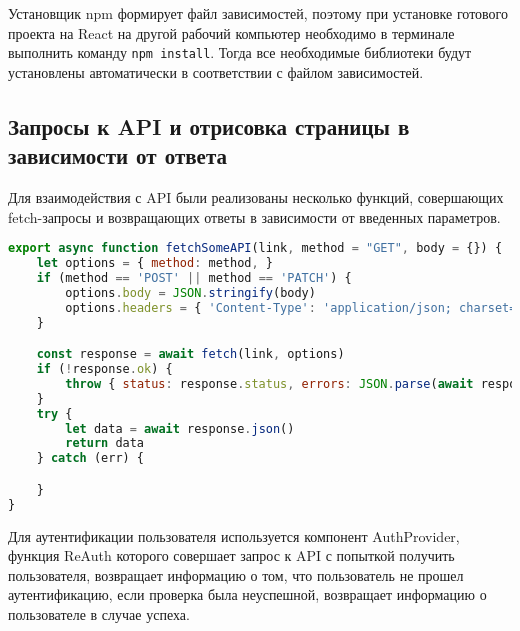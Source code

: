 \documentclass[a4paper,12pt]{article}
\begin{document}
Установщик npm формирует файл зависимостей, поэтому при установке готового проекта на React на другой рабочий компьютер необходимо в терминале выполнить команду \texttt{npm install}. Тогда все необходимые библиотеки будут установлены автоматически в соответствии с файлом зависимостей.

\subsection{Запросы к API и отрисовка страницы в зависимости от ответа}
Для взаимодействия с API были реализованы несколько функций, совершающих fetch-запросы и возвращающих ответы в зависимости от введенных параметров.


\begin{lstlisting}[language=JavaScript, caption={Вспомогательная функция, использующаяся для осуществления fetch-запросов с параметрами.}]
export async function fetchSomeAPI(link, method = "GET", body = {}) {
    let options = { method: method, }
    if (method == 'POST' || method == 'PATCH') {
        options.body = JSON.stringify(body)
        options.headers = { 'Content-Type': 'application/json; charset=UTF-8', }
    }

    const response = await fetch(link, options)
    if (!response.ok) {
        throw { status: response.status, errors: JSON.parse(await response.text() || "{}")?.errors }
    }
    try {
        let data = await response.json()
        return data
    } catch (err) {

    }
}
\end{lstlisting}

Для аутентификации пользователя используется компонент AuthProvider, функция ReAuth которого совершает запрос к API с попыткой получить пользователя, возвращает информацию о том, что пользователь не прошел аутентификацию, если проверка была неуспешной, возвращает информацию о пользователе в случае успеха.
\end{document}
